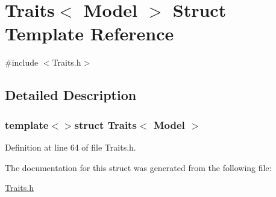 \hypertarget{struct_traits_3_01_model_01_4}{\section{Traits$<$ Model $>$ Struct Template Reference}
\label{struct_traits_3_01_model_01_4}
}


{\ttfamily \#include $<$Traits.\-h$>$}



\subsection{Detailed Description}
\subsubsection*{template$<$$>$struct Traits$<$ Model $>$}



Definition at line 64 of file Traits.\-h.



The documentation for this struct was generated from the following file\-:\begin{DoxyCompactItemize}
\item 
\hyperlink{_traits_8h}{Traits.\-h}\end{DoxyCompactItemize}
